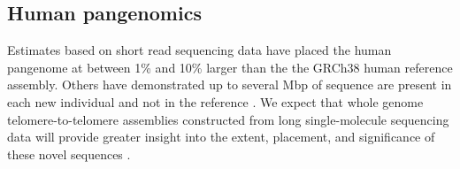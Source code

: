 \subsection{Human pangenomics}

Estimates based on short read sequencing data have placed the human pangenome at between 1\% \cite{li2010building} and 10\% \cite{sherman2019assembly} larger than the the GRCh38 human reference assembly.
Others have demonstrated up to several Mbp of sequence are present in each new individual and not in the reference \cite{Hehir-Kwa2016-hb,Steinberg_2016,Audano_2019}.
We expect that whole genome telomere-to-telomere assemblies constructed from long single-molecule sequencing data will provide greater insight into the extent, placement, and significance of these novel sequences \cite{miga2019telomere,Langley_2019}.





